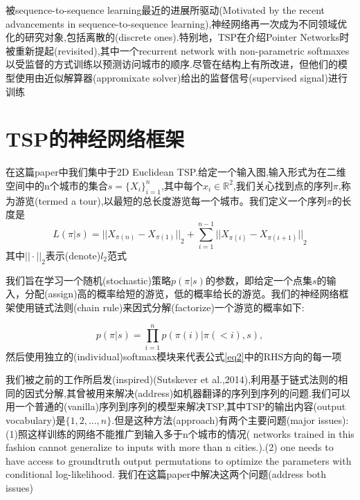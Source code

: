 \documentclass[a4paper,UTF8]{ctexart}
\theoremstyle{definition}
\begin{document}
被sequence-to-sequence learning最近的进展所驱动(Motivated by the recent advancements in sequence-to-sequence learning),神经网络再一次成为不同领域优化的研究对象,包括离散的(discrete ones).特别地，TSP在介绍Pointer Networks时被重新提起(revisited),其中一个recurrent network with non-parametric
softmaxes 以受监督的方式训练以预测访问城市的顺序.尽管在结构上有所改进，但他们的模型使用由近似解算器(appromixate solver)给出的监督信号(supervised signal)进行训练

\section{TSP的神经网络框架}
在这篇paper中我们集中于2D Euclidean TSP.给定一个输入图,输入形式为在二维空间中的n个城市的集合$s=\{{X_i}\}^n_{i=1}$,其中每个$x_i \in \mathbb{R}^2$,我们关心找到点的序列$\pi$,称为游览(termed a tour),以最短的总长度游览每一个城市。我们定义一个序列$\pi$的长度是
\begin{equation}
L(\pi | s)={||X_{\pi (n)}-X_{\pi (1)}||}_2+\sum_{i=1}^{n-1} {||X_{\pi (i)}-X_{\pi (i+1)}||}_2
\end{equation}
其中${||\cdot||}_2$表示(denote)$l_2$范式

我们旨在学习一个随机(stochastic)策略$p(\pi | s)$的参数，即给定一个点集$s$的输入，分配(assign)高的概率给短的游览，低的概率给长的游览。我们的神经网络框架使用链式法则(chain rule)来因式分解(factorize)一个游览的概率如下:

\begin{equation}\label{eq2}
p(\pi |s)=\prod_{i=1}^n p(\pi (i)| \pi (< i),s),
\end{equation}
然后使用独立的(individual)softmax模块来代表公式\eqref{eq2}中的RHS方向的每一项

我们被之前的工作所启发(inspired)(Sutskever et al.,2014),利用基于链式法则的相同的因式分解,其曾被用来解决(address)如机器翻译的序列到序列的问题.我们可以用一个普通的(vanilla)序列到序列的模型来解决TSP,其中TSP的输出内容(output vocabulary)是$\{1,2,...,n\}$.但是这种方法(approach)有两个主要问题(major issues):(1)照这样训练的网络不能推广到输入多于n个城市的情况( networks trained in this fashion cannot generalize to inputs with more than n cities.).(2) one needs to have access to groundtruth output permutations to optimize the parameters with conditional log-likelihood. 我们在这篇paper中解决这两个问题(address both issues)
\end{document}
